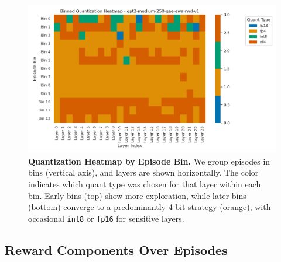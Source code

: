\documentclass{article}
\begin{document}
	\begin{figure}[ht]
		\centering
		\includegraphics[width=1.0\columnwidth]{gpt2-medium-250-gae-ewa-rwd-v1_quant_heatmap_binned.png}
		\caption{\small
			\textbf{Quantization Heatmap by Episode Bin.}
			We group episodes in bins (vertical axis), and layers are shown horizontally. 
			The color indicates which quant type was chosen for that layer within each bin. 
			Early bins (top) show more exploration, while later bins (bottom) converge to a predominantly 4-bit strategy (orange), with occasional \texttt{int8} or \texttt{fp16} for sensitive layers.
		}
		\label{fig:gpt2medium-binned-heatmap}
	\end{figure}
	
	\subsection{Reward Components Over Episodes}
	\label{sec:medium-rewards}
	
\end{document}
